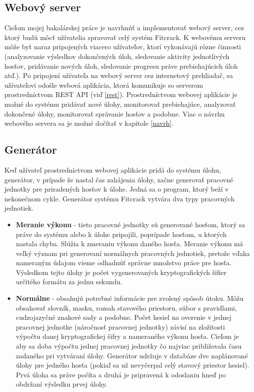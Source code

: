 \documentclass[slovak]{fitthesis}
\begin{document}
\subsection{Webový server}
Cieľom mojej bakalárskej práce je navrhnúť a implementovať webový server, cez ktorý budú môcť užívatelia spravovať celý systém Fitcrack. K webovému serveru môže byť naraz pripojených viacero užívateľov, ktorí vykonávajú rôzne činnosti (analyzovanie výsledkov dokončených úloh, sledovanie aktivity jednotlivých hosťov, pridávanie nových úloh, sledovanie progresu práve prebiehajúcich úloh atď.). Po pripojení užívateľa na webový server cez internetový prehliadač, sa užívateľovi odošle webová aplikácia, ktorá komunikuje so serverom prostredníctvom REST API (viď \ref{rest}). Prostredníctvom webovej aplikácie je možné do systému pridávať nové úlohy, monitorovať prebiehajúce, analyzovať dokončené úlohy, monitorovať správanie hosťov a podobne. Viac o návrhu webového servera sa je možné dočítať v kapitole \ref{navrh}.

\subsection{Generátor}
Keď užívateľ prostredníctvom webovej aplikácie pridá do systému úlohu, generátor, v prípade že nastal čas zahájenia úlohy, začne generovať pracovné jednotky pre priradených hosťov k úlohe. Jedná sa o program, ktorý beží v nekonečnom cykle. Generátor systému Fitcrack vytvára dva typy pracovných jednotiek.
\begin{itemize}
    \item \textbf{Meranie výkonu} - tieto pracovné jednotky sú generované hosťom, ktorý sa práve do systému alebo k úlohe pripojili, poprípade hosťom, u ktorých nastala chyba. Slúžia k zmeraniu výkonu daného hosťa. Meranie výkonu má veľký význam pri generovaní normálnych pracovných jednotiek, pretože vďaka nameraným údajom vieme odhadnúť správne množstvo práce pre hosťa. Výsledkom tejto úlohy je počet vygenerovaných kryptografických šifier určitého formátu za jednu sekundu. 
    \item \textbf{Normálne} - obsahujú potrebné informácie pre zvolený spôsob útoku. Môžu obsahovať slovník, masku, rozsah stavového priestoru, súbor s pravidlami, cudzojazyčné znakové sady a podobne. Počet hesiel na overenie v jednej pracovnej jednotke (náročnosť pracovnej jednotky) závisí na zložitosti výpočtu danej kryptografickej šifry a nameraného výkonu hosťa. Cieľom je aby sa doba výpočtu jednej pracovnej jednotky čo najviac približovala času zadaného pri vytváraní úlohy. Generátor udržuje v databáze dve naplánované úlohy pre jedného hosťa (pokiaľ sa už nevyčerpal celý stavový priestor hesiel). Prvá úloha sa práve počíta a druhá je pripravená k odoslaniu hneď po obdržaní výsledku prvej úlohy.
\end{itemize}
\end{document}
